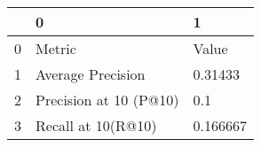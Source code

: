 \begin{tabular}{lll}
\toprule
{} &                       0 &         1 \\
\midrule
0 &                  Metric &     Value \\
1 &       Average Precision &   0.31433 \\
2 &  Precision at 10 (P@10) &       0.1 \\
3 &      Recall at 10(R@10) &  0.166667 \\
\bottomrule
\end{tabular}
